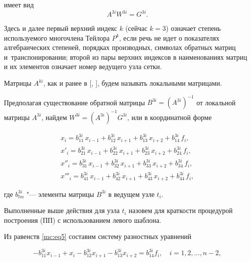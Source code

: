 имеет вид $$A^{3i}W^{3i}=G^{3i}.

$$

Здесь и далее первый верхний индекс $ k$ (сейчас $  k=3$) означает степень используемого многочлена Тейлора $P^k$, если речь не идет о показателях алгебраических степеней, порядках производных, символах обратных матриц и~транспонировании; второй из пары верхних индексов  в наименованиях матриц и их элементов означает номер ведущего узла сетки. 

Матрицы $  A^{ki}$, как и ранее в [, ], будем называть локальными матрицами.



Предполагая существование обратной матрицы $  B^{3i}=(A^{3i})^{-1}$   от локальной матрицы  $  A^{3i}$, найдем  $  W^{3i}=(A^{3i})^{-1} G^{3i}$, или в координатной форме

\begin{gather}

\label{mc:eq5}

  x_i=b_{11}^{3i}\,x_{i-1}+b_{12}^{3i}\,x_{i+1}+b_{13}^{3i}\,x_{i+2}+b_{14}^{3i}\,f_{i},

\\

\label{mc:eq6}

  x'_i=b_{21}^{3i}\,x_{i-1}+b_{22}^{3i}\,x_{i+1}+b_{23}^{3i}\,x_{i+2}+b_{24}^{3i}\,f_{i},

\\

\label{mc:eq8}

  x''_i=b_{31}^{3i}\,x_{i-1}+b_{32}^{3i}\,x_{i+1}+b_{33}^{3i}\,x_{i+2}+b_{34}^{3i}\,f_{i},

\\

\label{mc:eq8}

  x'''_i=b_{41}^{3i}\,x_{i-1}+b_{42}^{3i}\,x_{i+1}+b_{43}^{3i}\,x_{i+2}+b_{44}^{3i}\,f_{i},

\end{gather}

где  $  b_{lm}^{3i}$ "--- элементы  матрицы $  B^{3i}$  в ведущем узле $  t_i$.



Выполненные выше действия для узла $  t_i$ назовем для краткости процедурой построения (ПП) с использованием левого шаблона.



Из равенств \eqref{mc:eq5} составим систему разностных уравнений

\begin{equation}

\label{mc:eq9}

  -b_{11}^{3i} x_{i-1}+x_i-b_{12}^{3i} x_{i+1}-b_{13}^{3i} x_{i+2}=b_{14}^{3i} f_{i},

  \quad i=1,  2,  \dots,  n-2,

\end{equation}

